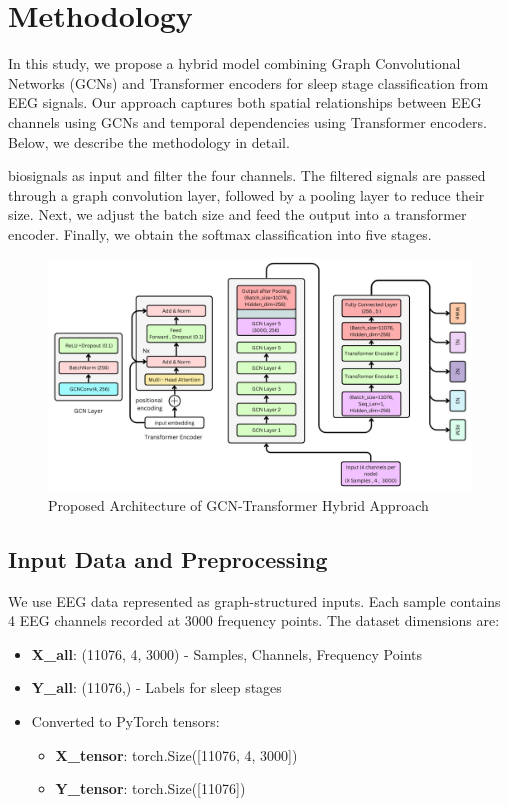 \section{Methodology}

In this study, we propose a hybrid model combining Graph Convolutional Networks (GCNs) and Transformer encoders for sleep stage classification from EEG signals. Our approach captures both spatial relationships between EEG channels using GCNs and temporal dependencies using Transformer encoders. Below, we describe the methodology in detail.

biosignals as input and filter the four channels. The filtered signals are passed through a graph convolution layer, followed by a pooling layer to reduce their size. Next, we adjust the batch size and feed the output into a transformer encoder. Finally, we obtain the softmax classification into five stages.

\begin{figure}
    \centering
    \includegraphics[width=1\linewidth]{img/Architechture.png}
    \caption{Proposed Architecture of GCN-Transformer Hybrid Approach}
    \label{fig:enter-label}
\end{figure}

\subsection{Input Data and Preprocessing}

We use EEG data represented as graph-structured inputs. Each sample contains 4 EEG channels recorded at 3000 frequency points. The dataset dimensions are:
\begin{itemize}
    \item \textbf{X\_all}: (11076, 4, 3000) - Samples, Channels, Frequency Points
    \item \textbf{Y\_all}: (11076,) - Labels for sleep stages
    \item Converted to PyTorch tensors:
    \begin{itemize}
        \item \textbf{X\_tensor}: torch.Size([11076, 4, 3000])
        \item \textbf{Y\_tensor}: torch.Size([11076])
    \end{itemize}
\end{itemize}

